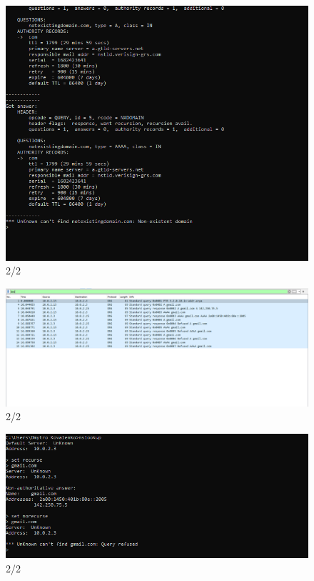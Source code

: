\documentclass{article}
\begin{document}
\begin{normalsize}
\begin{figure}[H]
	\includegraphics[width=\textwidth]{53}
	\caption{2/2}
\end{figure}
\begin{figure}[H]
	\centering
	\includegraphics[width=\textwidth]{61}
	\caption{2/2}
\end{figure}
\begin{figure}[H]
	\centering
	\includegraphics[width=\textwidth]{62}
	\caption{2/2}
\end{figure}
\begin{figure}[H]

\end{figure}
\end{normalsize}
\end{document}
